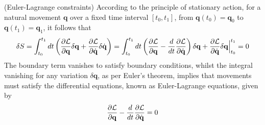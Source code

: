 \begin{theorem}(Euler-Lagrange constraints)
    According to the principle of stationary action, for a natural movement $\mathbf{q}$ over a fixed time interval $[t_0, t_1]$, 
    from $\mathbf{q}(t_0) = \mathbf{q}_0$ to $\mathbf{q}(t_1) = \mathbf{q}_1$, it follows that
    $$
      \delta S = \int_{t_0}^{t_1} dt \left( \frac{\partial {\cal L}}{\partial \mathbf{q}} \delta \mathbf{q} + \frac{\partial {\cal L}}{\partial \dot{\mathbf{q}}} \delta \dot{\mathbf{q}} \right) = \int_{t_0}^{t_1} dt \left( \frac{\partial {\cal L}}{\partial \mathbf{q}} - \frac{d}{dt}\frac{\partial {\cal L}}{\partial \dot{\mathbf{q}}} \right) \delta \mathbf{q} + \frac{\partial {\cal L}}{\partial \dot{\mathbf{q}}} \delta \mathbf{q} \Big\vert_{t_0}^{t_1} = 0
    $$
    The boundary term vanishes to satisfy boundary conditions, whilst the integral vanishing for any variation $\delta \mathbf{q}$, as per Euler's theorem,
	implies that movements must satisfy the differential equations, known as Euler-Lagrange equations, given by
    $$\frac{\partial {\cal L}}{\partial \mathbf{q}} - \frac{d}{dt}\frac{\partial {\cal L}}{\partial \dot{\mathbf{q}}} = 0$$
\end{theorem} 

